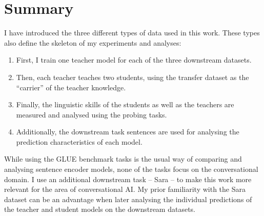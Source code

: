 \documentclass[bsc,frontabs,singlespacing,parskip,deptreport]{infthesis}
\begin{document}
{  \section{Summary}{
    I have introduced the three different types of data used in this work. These types also define the skeleton of my experiments and analyses:
    \begin{enumerate}
      \item First, I train one teacher model for each of the three downstream datasets.
      \item Then, each teacher teaches two students, using the transfer dataset as the ``carrier'' of the teacher knowledge.
      \item Finally, the linguistic skills of the students as well as the teachers are measured and analysed using the probing tasks.
      \item Additionally, the downstream task sentences are used for analysing the prediction characteristics of each model.
    \end{enumerate}
    While using the GLUE benchmark tasks is the usual way of comparing and analysing sentence encoder models, none of the tasks focus on the conversational domain. I use an additional downstream task -- Sara -- to make this work more relevant for the area of conversational AI.
    My prior familiarity with the Sara dataset can be an advantage when later analysing the individual predictions of the teacher and student models on the downstream datasets.
  }
}
\end{document}
